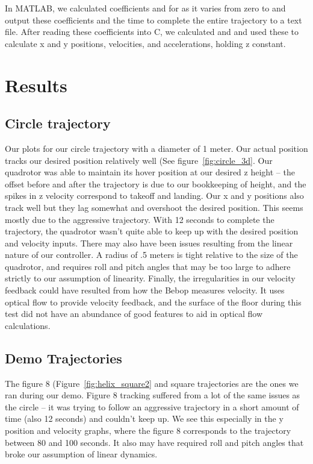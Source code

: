 \documentclass[english, twocolumn]{article}
\begin{document}
In MATLAB, we calculated coefficients  and  for  as it varies from zero to  and output these coefficients and the time to complete the entire trajectory to a text file. After reading these coefficients into C, we calculated  and and used these to calculate x and y positions, velocities, and accelerations, holding z constant.
\section*{Results} 
\subsection*{Circle trajectory}
Our plots for our circle trajectory with a diameter of 1 meter. Our actual position tracks our desired position relatively well (See figure~\ref{fig:circle_3d}. Our quadrotor was able to maintain its hover position at our desired z height – the offset before and after the trajectory is due to our bookkeeping of height, and the spikes in z velocity correspond to takeoff and landing. Our x and y positions also track well but they lag somewhat and overshoot the desired position. This seems mostly due to the aggressive trajectory. With 12 seconds to complete the trajectory, the quadrotor wasn’t quite able to keep up with the desired position and velocity inputs. There may also have been issues resulting from the linear nature of our controller. A radius of .5 meters is tight relative to the size of the quadrotor, and requires roll and pitch angles that may be too large to adhere strictly to our assumption of linearity. Finally, the irregularities in our velocity feedback could have resulted from how the Bebop measures velocity. It uses optical flow to provide velocity feedback, and the surface of the floor during this test did not have an abundance of good features to aid in optical flow calculations. 

\subsection*{Demo Trajectories }
The figure 8 (Figure~\ref{fig:helix_square2} and square trajectories are the ones we ran during our demo. Figure 8 tracking suffered from a lot of the same issues as the circle – it was trying to follow an aggressive trajectory in a short amount of time (also 12 seconds) and couldn’t keep up. We see this especially in the y position and velocity graphs, where the figure 8 corresponds to the trajectory between 80 and 100 seconds. It also may have required roll and pitch angles that broke our assumption of linear dynamics. 
\end{document}
